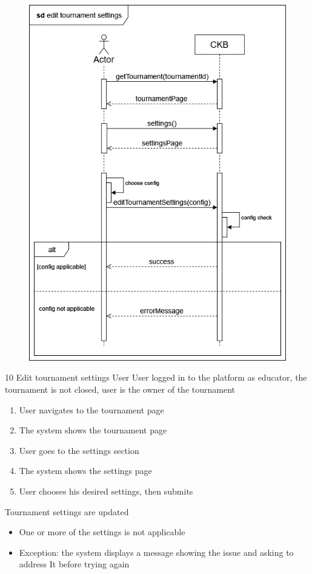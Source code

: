 \usecase
{
    \begin{figure}[H]
        \centering
        \includegraphics[width=\textwidth]{src/sequence_diagrams/managetournsetts.png}
    \end{figure}
}
{10}
{Edit tournament settings} %
{User} %
{User logged in to the platform as educator, the tournament is not closed, user is the owner of the tournament} %
{ %
    \begin{enumerate}
        \item User navigates to the tournament page
        \item The system shows the tournament page
        \item User goes to the settings section
        \item The system shows the settings page
        \item User chooses his desired settings, then submits
    \end{enumerate}
}
{Tournament settings are updated} %
{ %
    \begin{itemize}
        \item One or more of the settings is not applicable
    \end{itemize}
}
{ %
    \begin{itemize}
        \item Exception: the system displays a message showing the issue and asking to address It before trying again
    \end{itemize}
}

